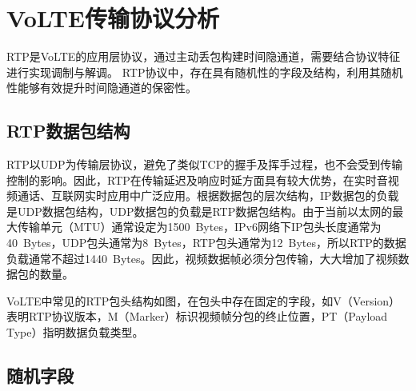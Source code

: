 \section{VoLTE传输协议分析}
\label{chap:backinfo:rtp}

RTP是VoLTE的应用层协议，通过主动丢包构建时间隐通道，需要结合协议特征进行实现调制与解调。
RTP协议中，存在具有随机性的字段及结构，利用其随机性能够有效提升时间隐通道的保密性。

\subsection{RTP数据包结构}
\label{chap:backinfo:rtp:struct}

RTP以UDP为传输层协议，避免了类似TCP的握手及挥手过程，也不会受到传输控制的影响。因此，RTP在传输延迟及响应时延方面具有较大优势，在实时音视频通话、互联网实时应用中广泛应用。根据数据包的层次结构，IP数据包的负载是UDP数据包结构，UDP数据包的负载是RTP数据包结构。由于当前以太网的最大传输单元（MTU）通常设定为{1500\ Bytes}，IPv6网络下IP包头长度通常为{40\ Bytes}，UDP包头通常为{8\ Bytes}，RTP包头通常为{12\ Bytes}，所以RTP的数据负载通常不超过{1440\ Bytes}。因此，视频数据帧必须分包传输，大大增加了视频数据包的数量。


VoLTE中常见的RTP包头结构如图，在包头中存在固定的字段，如V（{Version}）表明RTP协议版本，M（{Marker}）标识视频帧分包的终止位置，PT（{Payload Type}）指明数据负载类型。

\subsection{随机字段}
\label{chap:backinfo:rtp:random}

